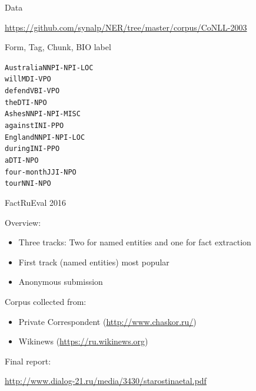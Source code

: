 \documentclass[10pt, compress]{beamer}
\begin{document}
\begin{frame}{Data}

\begin{center}
\url{https://github.com/synalp/NER/tree/master/corpus/CoNLL-2003}
\end{center}

Form, Tag, Chunk, BIO label

\begin{alltt}

Australia NNP I-NP I-LOC  \\ 
will MD I-VP O \\ 
defend VB I-VP O \\ 
the DT I-NP O \\ 
Ashes NNP I-NP I-MISC \\ 
against IN I-PP O \\
England NNP I-NP I-LOC \\
during IN I-PP O \\ 
a DT I-NP O \\ 
four-month JJ I-NP O \\ 
tour NN I-NP O \\ 

\end{alltt}

\end{frame}

\begin{frame}{FactRuEval 2016}

Overview:
\begin{itemize}
  \item Three tracks: Two for named entities and one for fact extraction
  \item First track (named entities) most popular
  \item Anonymous submission
\end{itemize}

Corpus collected from:
\begin{itemize}
  \item Private Correspondent (\url{http://www.chaskor.ru/})
  \item Wikinews (\url{https://ru.wikinews.org})
\end{itemize}

Final report:
\begin{center}
\url{http://www.dialog-21.ru/media/3430/starostinaetal.pdf}
\end{center}

\end{frame}
\end{document}
